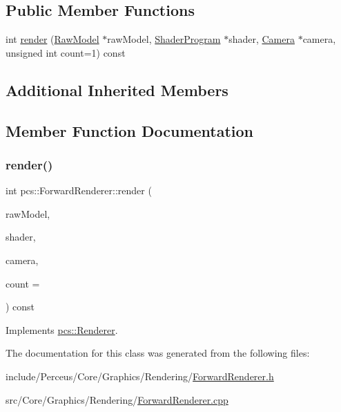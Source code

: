 \subsection*{Public Member Functions}
\begin{DoxyCompactItemize}
\item 
int \hyperlink{classpcs_1_1ForwardRenderer_a75527d1b400625fc9b33cddaff76bb33}{render} (\hyperlink{classpcs_1_1RawModel}{Raw\+Model} $\ast$raw\+Model, \hyperlink{classpcs_1_1ShaderProgram}{Shader\+Program} $\ast$shader, \hyperlink{classpcs_1_1Camera}{Camera} $\ast$camera, unsigned int count=1) const
\end{DoxyCompactItemize}
\subsection*{Additional Inherited Members}


\subsection{Member Function Documentation}
\mbox{\label{classpcs_1_1ForwardRenderer_a75527d1b400625fc9b33cddaff76bb33}} 
\subsubsection{\texorpdfstring{render()}{render()}}
{\footnotesize\ttfamily int pcs\+::\+Forward\+Renderer\+::render (\begin{DoxyParamCaption}\item[{\hyperlink{classpcs_1_1RawModel}{Raw\+Model} $\ast$}]{raw\+Model,  }\item[{\hyperlink{classpcs_1_1ShaderProgram}{Shader\+Program} $\ast$}]{shader,  }\item[{\hyperlink{classpcs_1_1Camera}{Camera} $\ast$}]{camera,  }\item[{unsigned int}]{count = {} }\end{DoxyParamCaption}) const\hspace{0.3cm}{\ttfamily [virtual]}}



Implements \hyperlink{classpcs_1_1Renderer_aba6bdcf38357cdfea898e0f7b3cb1757}{pcs\+::\+Renderer}.



The documentation for this class was generated from the following files\+:\begin{DoxyCompactItemize}
\item 
include/\+Perceus/\+Core/\+Graphics/\+Rendering/\hyperlink{ForwardRenderer_8h}{Forward\+Renderer.\+h}\item 
src/\+Core/\+Graphics/\+Rendering/\hyperlink{ForwardRenderer_8cpp}{Forward\+Renderer.\+cpp}\end{DoxyCompactItemize}
